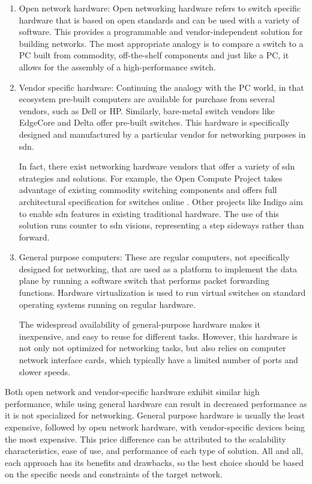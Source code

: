 \begin{enumerate}
	\item Open network hardware: 
    Open networking hardware refers to switch specific hardware that is based on open standards and can be used with a variety of software. This provides a programmable and vendor-independent solution for building networks. The most appropriate analogy is to compare a switch to a PC built from commodity, off-the-shelf components and just like a PC, it allows for the assembly of a high-performance switch\cite{peterson_software-defined_2021}. 

\item Vendor specific hardware:
    Continuing the analogy with the PC world, in that ecosystem pre-built computers are available for purchase from several vendors, such as Dell or HP. Similarly, bare-metal switch vendors like EdgeCore and Delta offer pre-built switches\cite{peterson_software-defined_2021}. This hardware is specifically designed and manufactured by a particular vendor for networking purposes in \gls{sdn}. 

    In fact, there exist networking hardware vendors that offer a variety of \gls{sdn} strategies and solutions. For example, the Open Compute Project takes advantage of existing commodity switching components and offers full architectural specification for switches online \cite{noauthor_open_nodate-1}. Other projects like Indigo\cite{noauthor_indigo_nodate} aim to enable \gls{sdn} features in existing traditional hardware. The use of this solution runs counter to \gls{sdn} visions, representing a step sideways rather than forward.

	\item     General purpose computers:
    These are regular computers, not specifically designed for networking, that are used as a platform to implement the data plane by running a software switch that performs packet forwarding functions. Hardware virtualization is used to run virtual switches on standard operating systems running on regular hardware.

    The widespread availability of general-purpose hardware makes it inexpensive, and easy to reuse for different tasks. However, this hardware is not only not optimized for networking tasks, but also relies on computer network interface cards, which typically have a limited number of ports and slower speeds.
\end{enumerate}

Both open network and vendor-specific hardware exhibit similar high performance, while using general hardware can result in decreased performance as it is not specialized for networking. General purpose hardware is usually the least expensive, followed by open network hardware, with vendor-specific devices being the most expensive. This price difference can be attributed to the scalability characteristics, ease of use, and performance of each type of solution. All and all, each approach has its benefits and drawbacks, so the best choice should be based on the specific needs and constraints of the target network.

